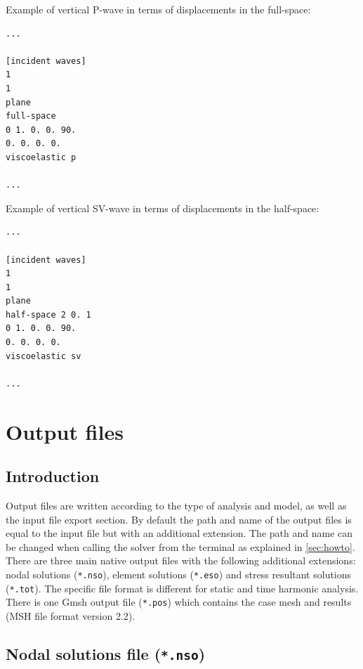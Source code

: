 \documentclass[a4paper,fleqn]{book}
\begin{document}
Example of vertical P-wave in terms of displacements in the full-space: 
\begin{Verbatim}[frame=single, fontsize=\small, label={input.dat}]
...

[incident waves]
1
1
plane
full-space
0 1. 0. 0. 90.
0. 0. 0. 0.
viscoelastic p

...
\end{Verbatim} 
Example of vertical SV-wave in terms of displacements in the half-space: 
\begin{Verbatim}[frame=single, fontsize=\small, label={input.dat}]
...

[incident waves]
1
1
plane
half-space 2 0. 1
0 1. 0. 0. 90.
0. 0. 0. 0.
viscoelastic sv

...
\end{Verbatim}


\chapter{Output files}

\label{ch:output_files}

\section{Introduction}

Output files are written according to the type of analysis and model, as well as the input file export section. By default the path and name of the output files is equal to the input file but with an additional extension. The path and name can be changed when calling the solver from the terminal as explained in \ref{sec:howto}. There are three main native output files with the following additional extensions: nodal solutions (\texttt{*.nso}), element solutions (\texttt{*.eso}) and stress resultant solutions (\texttt{*.tot}). The specific file format is different for static and time harmonic analysis. There is one Gmsh output file (\texttt{*.pos}) which contains the case mesh and results (MSH file format version 2.2).

\section{Nodal solutions file (\texttt{*.nso})}
\end{document}
